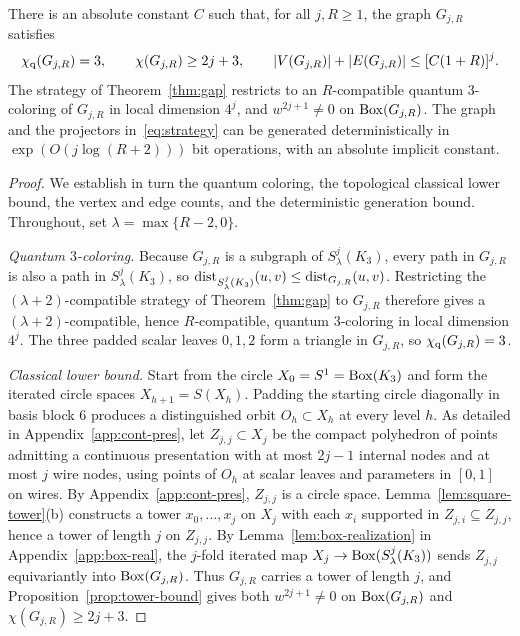 \begin{theorem}\label{thm:sparse}
There is an absolute constant $C$ such that, for all $j,R\ge1$, the graph $G_{j,R}$ satisfies
\[
 \chi_{\mathrm q}(G_{j,R})=3,\qquad \chi(G_{j,R})\ge2j+3,\qquad |V(G_{j,R})|+|E(G_{j,R})|\le[C(1+R)]^j.
\]
The strategy of Theorem~\ref{thm:gap} restricts to an $R$-compatible quantum $3$-coloring of $G_{j,R}$ in local dimension $4^j$, and $w^{2j+1}\ne0$ on $\operatorname{Box}(G_{j,R})$. The graph and the projectors in~\eqref{eq:strategy} can be generated deterministically in $\exp(O(j\log(R+2)))$ bit operations, with an absolute implicit constant.
\end{theorem}
\begin{proof}
We establish in turn the quantum coloring, the topological classical lower bound, the vertex and edge counts, and the deterministic generation bound. Throughout, set $\lambda=\max\{R-2,0\}$.

\emph{Quantum $3$-coloring.} Because $G_{j,R}$ is a subgraph of $S^j_\lambda(K_3)$, every path in $G_{j,R}$ is also a path in $S^j_\lambda(K_3)$, so $\operatorname{dist}_{S^j_\lambda(K_3)}(u,v)\le\operatorname{dist}_{G_{j,R}}(u,v)$. Restricting the $(\lambda+2)$-compatible strategy of Theorem~\ref{thm:gap} to $G_{j,R}$ therefore gives a $(\lambda+2)$-compatible, hence $R$-compatible, quantum $3$-coloring in local dimension $4^j$. The three padded scalar leaves $0,1,2$ form a triangle in $G_{j,R}$, so $\chi_{\mathrm q}(G_{j,R})=3$.

\emph{Classical lower bound.} Start from the circle $X_0=S^1=\operatorname{Box}(K_3)$ and form the iterated circle spaces $X_{h+1}=S(X_h)$. Padding the starting circle diagonally in basis block $6$ produces a distinguished orbit $O_h\subset X_h$ at every level $h$. As detailed in Appendix~\ref{app:cont-pres}, let $Z_{j,j}\subset X_j$ be the compact polyhedron of points admitting a continuous presentation with at most $2j-1$ internal nodes and at most $j$ wire nodes, using points of $O_h$ at scalar leaves and parameters in $[0,1]$ on wires. By Appendix~\ref{app:cont-pres}, $Z_{j,j}$ is a circle space. Lemma~\ref{lem:square-tower}(b) constructs a tower $x_0,\ldots,x_j$ on $X_j$ with each $x_i$ supported in $Z_{j,i}\subseteq Z_{j,j}$, hence a tower of length $j$ on $Z_{j,j}$. By Lemma~\ref{lem:box-realization} in Appendix~\ref{app:box-real}, the $j$-fold iterated map $X_j\to\operatorname{Box}(S^j_\lambda(K_3))$ sends $Z_{j,j}$ equivariantly into $\operatorname{Box}(G_{j,R})$. Thus $G_{j,R}$ carries a tower of length $j$, and Proposition~\ref{prop:tower-bound} gives both $w^{2j+1}\ne0$ on $\operatorname{Box}(G_{j,R})$ and $\chi(G_{j,R})\ge2j+3$.


\end{proof}

